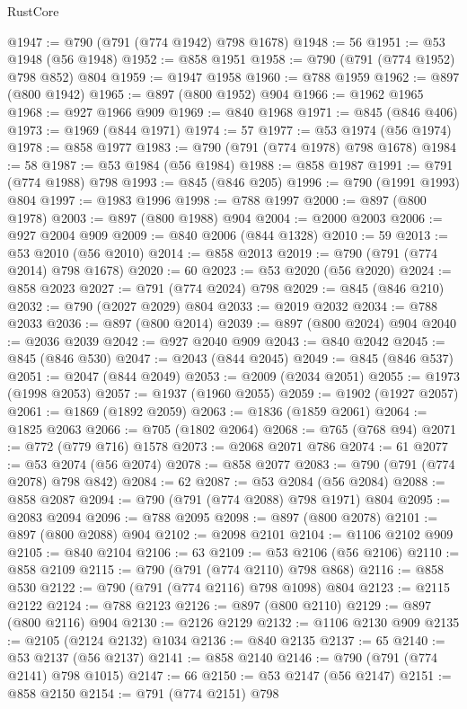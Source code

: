 \begin{lexlean}{RustCore}
\begin{coremodule}
@1947 := @790 (@791 (@774 @1942) @798 @1678)
@1948 := 56
@1951 := @53 @1948 (@56 @1948)
@1952 := @858 @1951
@1958 := @790 (@791 (@774 @1952) @798 @852) @804
@1959 := @1947 @1958
@1960 := @788 @1959
@1962 := @897 (@800 @1942)
@1965 := @897 (@800 @1952) @904
@1966 := @1962 @1965
@1968 := @927 @1966 @909
@1969 := @840 @1968
@1971 := @845 (@846 @406)
@1973 := @1969 (@844 @1971)
@1974 := 57
@1977 := @53 @1974 (@56 @1974)
@1978 := @858 @1977
@1983 := @790 (@791 (@774 @1978) @798 @1678)
@1984 := 58
@1987 := @53 @1984 (@56 @1984)
@1988 := @858 @1987
@1991 := @791 (@774 @1988) @798
@1993 := @845 (@846 @205)
@1996 := @790 (@1991 @1993) @804
@1997 := @1983 @1996
@1998 := @788 @1997
@2000 := @897 (@800 @1978)
@2003 := @897 (@800 @1988) @904
@2004 := @2000 @2003
@2006 := @927 @2004 @909
@2009 := @840 @2006 (@844 @1328)
@2010 := 59
@2013 := @53 @2010 (@56 @2010)
@2014 := @858 @2013
@2019 := @790 (@791 (@774 @2014) @798 @1678)
@2020 := 60
@2023 := @53 @2020 (@56 @2020)
@2024 := @858 @2023
@2027 := @791 (@774 @2024) @798
@2029 := @845 (@846 @210)
@2032 := @790 (@2027 @2029) @804
@2033 := @2019 @2032
@2034 := @788 @2033
@2036 := @897 (@800 @2014)
@2039 := @897 (@800 @2024) @904
@2040 := @2036 @2039
@2042 := @927 @2040 @909
@2043 := @840 @2042
@2045 := @845 (@846 @530)
@2047 := @2043 (@844 @2045)
@2049 := @845 (@846 @537)
@2051 := @2047 (@844 @2049)
@2053 := @2009 (@2034 @2051)
@2055 := @1973 (@1998 @2053)
@2057 := @1937 (@1960 @2055)
@2059 := @1902 (@1927 @2057)
@2061 := @1869 (@1892 @2059)
@2063 := @1836 (@1859 @2061)
@2064 := @1825 @2063
@2066 := @705 (@1802 @2064)
@2068 := @765 (@768 @94)
@2071 := @772 (@779 @716) @1578
@2073 := @2068 @2071 @786
@2074 := 61
@2077 := @53 @2074 (@56 @2074)
@2078 := @858 @2077
@2083 := @790 (@791 (@774 @2078) @798 @842)
@2084 := 62
@2087 := @53 @2084 (@56 @2084)
@2088 := @858 @2087
@2094 := @790 (@791 (@774 @2088) @798 @1971) @804
@2095 := @2083 @2094
@2096 := @788 @2095
@2098 := @897 (@800 @2078)
@2101 := @897 (@800 @2088) @904
@2102 := @2098 @2101
@2104 := @1106 @2102 @909
@2105 := @840 @2104
@2106 := 63
@2109 := @53 @2106 (@56 @2106)
@2110 := @858 @2109
@2115 := @790 (@791 (@774 @2110) @798 @868)
@2116 := @858 @530
@2122 := @790 (@791 (@774 @2116) @798 @1098) @804
@2123 := @2115 @2122
@2124 := @788 @2123
@2126 := @897 (@800 @2110)
@2129 := @897 (@800 @2116) @904
@2130 := @2126 @2129
@2132 := @1106 @2130 @909
@2135 := @2105 (@2124 @2132) @1034
@2136 := @840 @2135
@2137 := 65
@2140 := @53 @2137 (@56 @2137)
@2141 := @858 @2140
@2146 := @790 (@791 (@774 @2141) @798 @1015)
@2147 := 66
@2150 := @53 @2147 (@56 @2147)
@2151 := @858 @2150
@2154 := @791 (@774 @2151) @798

\end{coremodule}
\end{lexlean}
